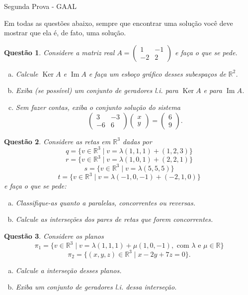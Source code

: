 \documentclass[a4paper,10pt]{article}
\author{Segunda Prova - GAAL}
\date{04 de Abril de 2019}
\title{}
\def\R{\mathbb R}
\DeclareMathOperator{\Ker}{Ker}
\DeclareMathOperator{\im}{Im}
\newtheorem{qst}{Questão}
\begin{document}
\begin{center}
	{\Large{\sc Segunda Prova - GAAL}}
\end{center}

	
Em todas as questões abaixo, sempre que encontrar uma solução você deve mostrar que ela é, de fato, uma solução.

\begin{qst}
	Considere a matriz real $A=\begin{pmatrix}
	1 & -1\\-2&2
	\end{pmatrix}$ e faça o que se pede.
	\begin{enumerate}[a)]
		\item Calcule $\Ker A$ e $\im A$ e faça um esboço gráfico desses subespaços de $\R^2$.
		\item Exiba (se possível) um conjunto de geradores l.i. para $\Ker A$ e para $\im A$.
		\item Sem fazer contas, exiba o conjunto solução do sistema
		\[\begin{pmatrix}
		3&-3\\-6&6
		\end{pmatrix}\begin{pmatrix}
		x\\y
		\end{pmatrix}=\begin{pmatrix}
		6\\9
		\end{pmatrix}.\] 
	\end{enumerate}
\end{qst}

\begin{qst}
	Considere as retas em $\R^3$ dadas por $$q=\{v\in\R^3\mid v=\lambda (1,1,1)+(1,2,3)\}$$ $$r=\{v\in\R^3\mid v=\lambda (1,0,1)+(2,2,1)\}$$ $$s=\{v\in\R^3\mid v=\lambda (5,5,5)\}$$$$t=\{v\in\R^3\mid v=\lambda (-1,0,-1)+(-2,1,0)\}$$ e faça o que se pede:
	\begin{enumerate}[a)]
		\item Classifique-as quanto a paralelas, concorrentes ou reversas.
		\item Calcule as interseções dos pares de retas que forem concorrentes.
	\end{enumerate}
\end{qst}

\begin{qst}
	Considere os planos $$\pi_1=\{v\in \R^3\mid v=\lambda(1,1,1)+\mu(1,0,-1),\mbox{ com }\lambda\mbox{ e }\mu\in \R\}$$ $$\pi_2=\{(x,y,z)\in\R^3\mid x-2y+7z=0\}.$$
	\begin{enumerate}[a)]
		\item Calcule a interseção desses planos.
		\item Exiba um conjunto de geradores l.i. dessa interseção.
	\end{enumerate}
\end{qst}
\end{document}
